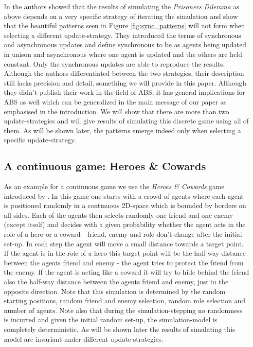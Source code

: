 In \cite{huberman_evolutionary_1993} the authors showed that the results of simulating the \textit{Prisoners Dilemma} as above depends on a very specific strategy of iterating the simulation and show that the beautiful patterns seen in Figure \ref{fig:sync_patterns} will not form when selecting a different update-strategy. They introduced the terms of synchronous and asynchronous updates and define synchronous to be as agents being updated in unison and asynchronous where one agent is updated and the others are held constant. Only the synchronous updates are able to reproduce the results. Although the authors differentiated between the two strategies, their description still lacks precision and detail, something we will provide in this paper. Although they didn't publish their work in the field of ABS, it has general implications for ABS as well which can be generalized in the main message of our paper as emphasised in the introduction. We will show that there are more than two update-strategies and will give results of simulating this discrete game using all of them. As will be shown later, the patterns emerge indeed only when selecting a specific update-strategy.

\subsection{A continuous game: Heroes \& Cowards}
As an example for a continuous game we use the \textit{Heroes \& Cowards} game introduced by \cite{wilensky_introduction_2015}. In this game one starts with a crowd of agents where each agent is positioned randomly in a continuous 2D-space which is bounded by borders on all sides. Each of the agents then selects randomly one friend and one enemy (except itself) and decides with a given probability whether the agent acts in the role of a hero or a coward - friend, enemy and role don't change after the initial set-up. In each step the agent will move a small distance towards a target point. If the agent is in the role of a hero this target point will be the half-way distance between the agents friend and enemy - the agent tries to protect the friend from the enemy. If the agent is acting like a coward it will try to hide behind the friend also the half-way distance between the agents friend and enemy, just in the opposite direction. Note that this simulation is determined by the random starting positions, random friend and enemy selection, random role selection and number of agents. Note also that during the simulation-stepping no randomness is incurred and given the initial random set-up, the simulation-model is completely deterministic. As will be shown later the results of simulating this model are invariant under different update-strategies.

